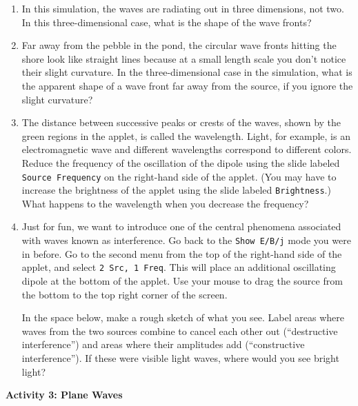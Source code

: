 \begin{enumerate}[labparts]

\item In this simulation, the waves are radiating out in three dimensions, not two.  In this three-dimensional case, what is the shape of the wave fronts?
\answerspace{1cm}

\item Far away from the pebble in the pond, the circular wave fronts hitting the shore look like straight lines because at a small length scale you don't notice their slight curvature. 
In the three-dimensional case in the simulation, what is the apparent shape of a wave front far away from the source, if you ignore the slight curvature?
\answerspace{1cm}


\pagebreak[2]
\item The distance between successive peaks or crests of the waves, shown by the green regions in the
applet, is called the wavelength.  
Light, for example, is an electromagnetic wave and different wavelengths correspond 
to different colors.
Reduce the frequency of the oscillation of the dipole using the slide labeled
\texttt{Source Frequency} on the right-hand side of the applet.
(You may have to increase the brightness of the applet using the slide labeled
\texttt{Brightness}.)
What happens to the wavelength when you decrease the frequency?
\answerspace{1.0cm}


\item Just for fun, we want to introduce one of the central phenomena associated
with waves known as interference.
Go back to the \texttt{Show E/B/j} mode you were in before. 
Go to the second menu from the top of the right-hand side of the applet, and select
\texttt{2 Src, 1 Freq}.
This will place an additional oscillating dipole at the bottom of the applet.  Use your mouse to drag the source from the bottom to the top right corner of the screen.

In the space below, make a rough sketch of what you see.  Label areas where waves from the two sources combine to cancel each other out (``destructive interference'') and areas where their amplitudes add (``constructive interference'').  If these were visible light waves, where would you see bright light?
\vfill

\end{enumerate}

\textbf{Activity 3: Plane Waves}



